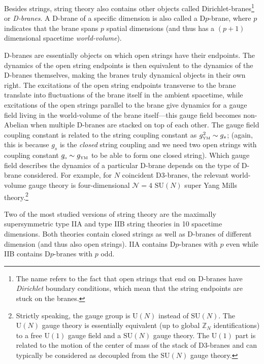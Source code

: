 \documentclass[12pt]{article}
\renewcommand{\^}[1]{\hat{#1}}
\newcommand{\tn}[1]{\mbox{\tiny #1}}
\begin{document}
Besides strings, string theory also contains other objects called Dirichlet-branes\footnote{The name refers to the fact that open strings that end on D-branes have \emph{Dirichlet} boundary conditions, which mean that the string endpoints are stuck on the branes.} or \emph{D-branes}. %
A D-brane of a specific dimension is also called a D$p$-brane, where $p$ indicates that the brane spans $p$ spatial dimensions (and thus has a $(p+1)$ dimensional spacetime {\it world-volume}).

D-branes are essentially objects on which open strings have their endpoints. The dynamics of the open string endpoints is then equivalent to the dynamics of the D-branes themselves, making the branes truly dynamical objects in their own right. The excitations of the open string endpoints transverse to the brane translate into fluctuations of the brane itself in the ambient spacetime, while excitations of the open strings parallel to the brane give dynamics for a gauge field
  living in the world-volume of the brane itself---this gauge field becomes non-Abelian when multiple D-branes are stacked on top of each other. The gauge field coupling constant is related to the string coupling constant as $g_{\tn{YM}}^2\sim g_s$; (again, this is because $g_s$ is the \emph{closed} string coupling and we need two open strings with coupling constant $g_{\tn{o}}\sim g_{\tn{YM}}$ to be able to form one closed string). Which gauge field describes the dynamics of a particular D-brane depends on the type of D-brane considered. For example, for $N$ coincident D3-branes, the relevant world-volume gauge theory is four-dimensional $\mathcal{N}=4$ $\mbox{SU}(N)$ super Yang Mills theory.\footnote{Strictly speaking, the gauge group is $\mbox{U}(N)$ instead of $\mbox{SU}(N)$. The $\mbox{U}(N)$ gauge theory is essentially equivalent (up to global $\mathbb{Z}_N$ identifications) to a free $\mbox{U}(1)$ gauge field and a $\mbox{SU}(N)$ gauge theory. The $\mbox{U}(1)$ part is related to the motion of the center of mass of the stack of D3-branes and can typically be considered as decoupled from the $\mbox{SU}(N)$ gauge theory.}

Two of the most studied versions of string theory are the maximally supersymmetric type IIA and type IIB string theories in 10 spacetime dimensions. Both theories contain closed strings as well as D-branes of different dimension (and thus also open strings). IIA contains D$p$-branes with $p$ even while IIB contains D$p$-branes with $p$ odd.
\end{document}
